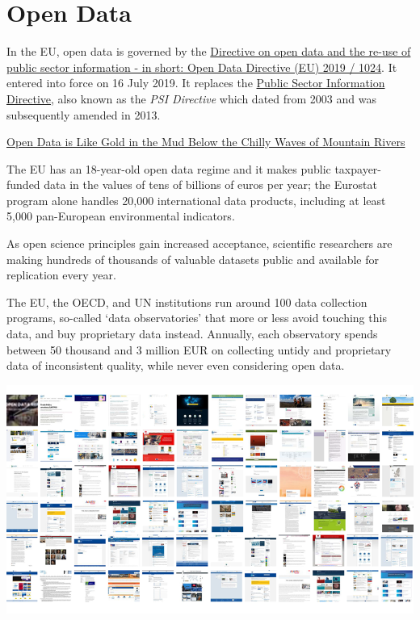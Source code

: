 \documentclass[
  a4paper,
  openany, a4paper, oneside]{book}
\begin{document}
\hypertarget{open-data}{%
\chapter{Open Data}\label{open-data}}

In the EU, open data is governed by the \href{https://eur-lex.europa.eu/legal-content/EN/TXT/?qid=1561563110433\&uri=CELEX:32019L1024}{Directive on open data and the re-use of public sector information - in short: Open Data Directive (EU) 2019 / 1024}. It entered into force on 16 July 2019. It replaces the \href{https://eur-lex.europa.eu/legal-content/en/ALL/?uri=CELEX:32003L0098}{Public Sector Information Directive}, also known as the \emph{PSI Directive} which dated from 2003 and was subsequently amended in 2013.

\href{https://greendeal.dataobservatory.eu/post/2021-06-10-founder-daniel-antal/}{Open Data is Like Gold in the Mud Below the Chilly Waves of Mountain Rivers}

The EU has an 18-year-old open data regime and it makes public taxpayer-funded data in the values of tens of billions of euros per year; the Eurostat program alone handles 20,000 international data products, including at least 5,000 pan-European environmental indicators.

As open science principles gain increased acceptance, scientific researchers are making hundreds of thousands of valuable datasets public and available for replication every year.

The EU, the OECD, and UN institutions run around 100 data collection programs, so-called `data observatories' that more or less avoid touching this data, and buy proprietary data instead. Annually, each observatory spends between 50 thousand and 3 million EUR on collecting untidy and proprietary data of inconsistent quality, while never even considering open data.

\begin{center}\includegraphics[width=11.11in]{plots/screenshots/observatory_collage_16x9_800} \end{center}
\end{document}
